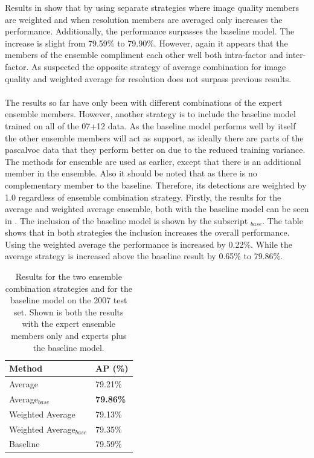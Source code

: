 Results in  show that by using separate strategies where image quality members are weighted and when resolution members are averaged only increases the performance. Additionally, the performance surpasses the baseline model. The increase is slight from 79.59\% to 79.90\%. However, again it appears that the members of the ensemble compliment each other well both intra-factor and inter-factor. As suspected the opposite strategy of average combination for image quality and weighted average for resolution does not surpass previous results. 
\\\\
The results so far have only been with different combinations of the expert ensemble members. However, another strategy is to include the baseline model trained on all of the 07+12 data. As the baseline model performs well by itself the other ensemble members will act as support, as ideally there are parts of the \gls{pascalvoc} data that they perform better on due to the reduced training variance. The methods for ensemble are used as earlier, except that there is an additional member in the ensemble. Also it should be noted that as there is no complementary member to the baseline. Therefore, its detections are weighted by 1.0 regardless of ensemble combination strategy. Firstly, the results for the average and weighted average ensemble, both with the baseline model can be seen in . The inclusion of the baseline model is shown by the subscript $_{base}$. The table shows that in both strategies the inclusion increases the overall performance. Using the weighted average the performance is increased by 0.22\%. While the average strategy is increased above the baseline result by 0.65\% to 79.86\%.

\begin{table}[h]
\centering
\caption{Results for the two ensemble combination strategies and for the baseline model on the 2007 test set. Shown is both the results with the expert ensemble members only and experts plus the baseline model.}
\label{tab:ensemble_base}
\begin{tabular}{|l|l|}
\hline
\textbf{Method}           & \textbf{AP (\%)} \\ \hline
Average          & 79.21\% \\ \hline
Average$_{base}$          & \textbf{79.86\%} \\ \hline
Weighted Average & 79.13\% \\ \hline
Weighted Average$_{base}$ & 79.35\% \\ \hline
Baseline         & 79.59\% \\ \hline
\end{tabular}
\end{table}


